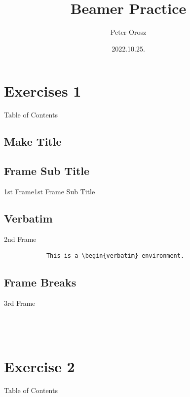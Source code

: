 \documentclass[12pt, aspectratio=169, xcolor={table}]{beamer}
\author{Peter Orosz}
\title{Beamer Practice}
\institute{University of Miskolc}
\date{2022.10.25.}
\begin{document}
	\section{Exercises 1}
	\begin{frame}{Table of Contents}
		\tableofcontents[currentsection]
	\end{frame}
	\subsection{Make Title}
	\begin{frame}
		\maketitle
	\end{frame}
	\subsection{Frame Sub Title}
	\begin{frame}{1st Frame}{1st Frame Sub Title}
		
	\end{frame}
	\subsection{Verbatim}
	\begin{frame}[fragile]{2nd Frame}
		\begin{verbatim}
			This is a \begin{verbatim} environment.
		\end{verbatim}
	\end{frame}
	\subsection{Frame Breaks}
	\begin{frame}[allowframebreaks]{3rd Frame}
		\lipsum[1]\\
		\lipsum[1]\\
		\lipsum[1]\\
		\lipsum[1]\\
	\end{frame}
	\section{Exercise 2}
	\begin{frame}{Table of Contents}
		\tableofcontents[currentsection]
	\end{frame}
\end{document}
